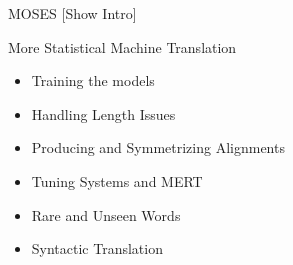 \documentclass{beamer}
\begin{document}
\begin{frame}{MOSES}
  [Show Intro]
\end{frame}

\begin{frame}{More Statistical Machine Translation}
  \begin{itemize}
    \item Training the models 
      \pause
  \item Handling Length Issues
      \pause
  \item Producing and Symmetrizing Alignments
      \pause
  \item Tuning Systems and MERT 
      \pause
  \item Rare and Unseen Words
      \pause
  \item Syntactic Translation
  \end{itemize}
\end{frame}
\end{document}
